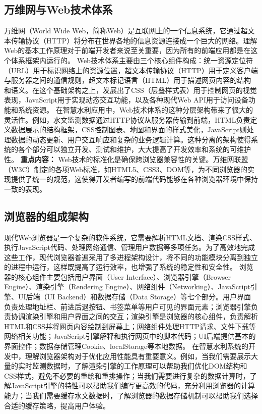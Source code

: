 \subsection{万维网与Web技术体系}\label{ux4e07ux7ef4ux7f51ux4e0ewebux6280ux672fux4f53ux7cfb} 万维网（World Wide
Web，简称Web）是互联网上的一个信息系统，它通过超文本传输协议（HTTP）将分布在世界各地的信息资源连接成一个巨大的网络。理解Web的基本工作原理对于前端开发者来说至关重要，因为所有的前端应用都是在这个体系框架内运行的。
Web技术体系主要由三个核心组件构成：统一资源定位符（URL）用于标识网络上的资源位置，超文本传输协议（HTTP）用于定义客户端与服务器之间的通信规则，超文本标记语言（HTML）用于描述网页内容的结构和语义。在这个基础架构之上，发展出了CSS（层叠样式表）用于控制网页的视觉表现，JavaScript用于实现动态交互功能，以及各种现代Web
API用于访问设备功能和系统资源。
在智慧水利应用中，Web技术体系的这种分层架构带来了很大的灵活性。例如，水文监测数据通过HTTP协议从服务器传输到前端，HTML负责定义数据展示的结构框架，CSS控制图表、地图和界面的样式美化，JavaScript则处理数据的动态更新、用户交互响应和复杂的业务逻辑计算。这种分离的架构使得系统的各个部分可以独立开发、测试和维护，大大提高了开发效率和系统的可维护性。
\textbf{重点内容：}
Web技术的标准化是确保跨浏览器兼容性的关键。万维网联盟（W3C）制定的各项Web标准，如HTML5、CSS3、DOM等，为不同浏览器的实现提供了统一的规范，这使得开发者编写的前端代码能够在各种浏览器环境中保持一致的表现。
\subsection{浏览器的组成架构}\label{ux6d4fux89c8ux5668ux7684ux7ec4ux6210ux67b6ux6784}
现代Web浏览器是一个复杂的软件系统，它需要解析HTML文档、渲染CSS样式、执行JavaScript代码、处理网络通信、管理用户数据等多项任务。为了高效地完成这些工作，现代浏览器普遍采用了多进程架构设计，将不同的功能模块分离到独立的进程中运行，这样既提高了运行效率，也增强了系统的稳定性和安全性。
浏览器的核心组件主要包括用户界面（User Interface）、浏览器引擎（Browser Engine）、渲染引擎（Rendering Engine）、网络组件（Networking）、JavaScript引擎、UI后端（UI
Backend）和数据存储（Data
Storage）等七个部分。用户界面负责处理地址栏、前进后退按钮、书签菜单等用户可见的界面元素；浏览器引擎负责协调渲染引擎和用户界面之间的交互；渲染引擎是浏览器的核心组件，负责解析HTML和CSS并将网页内容绘制到屏幕上；网络组件处理HTTP请求、文件下载等网络相关功能；JavaScript引擎解释和执行网页中的脚本代码；UI后端提供基本的界面控件；数据存储管理Cookie、localStorage等本地数据。
在智慧水利系统的开发中，理解浏览器架构对于优化应用性能具有重要意义。例如，当我们需要展示大量的实时监测数据时，了解渲染引擎的工作原理可以帮助我们优化DOM结构和CSS样式，避免不必要的重绘和重排操作；当我们需要进行复杂的数据计算时，了解JavaScript引擎的特性可以帮助我们编写更高效的代码，充分利用浏览器的计算能力；当我们需要缓存水文数据时，了解浏览器的数据存储机制可以帮助我们选择合适的缓存策略，提高用户体验。
